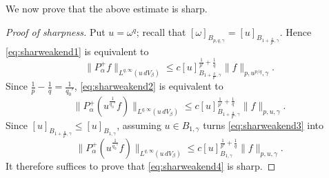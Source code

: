 \documentclass[a4paper,11pt,intlimits,oneside]{amsart}
\theoremstyle{definition}
\numberwithin{equation}{section}
\theoremstyle{definition}
\begin{document}
We now prove that the above estimate is sharp.
\begin{proof}[Proof of sharpness]
Put $u=\omega^q$; recall that $[\omega]_{B_{p,q,\gamma}}=[u]_{B_{1+\frac{q}{p'},\gamma}}$. Hence \eqref{eq:sharweakend1} is equivalent to
\begin{equation}\label{eq:sharweakend2}\|P_{\alpha}^+f\|_{L^{q,\infty}(u\,{d}V_{\beta})}\le c[u]_{B_{1+\frac{q}{p'},\gamma}}^{\frac{1}{p'}+\frac{1}{q}}\|f\|_{p,u^{p/q},\gamma}.
\end{equation}
Since $\frac{1}{p}-\frac{1}{q}=\frac{1}{q_0'}$, \eqref{eq:sharweakend2} is equivalent to
    \begin{equation}\label{eq:sharweakend3}\|P_{\alpha}^+(u^{\frac{1}{q_0'}}f)\|_{L^{q,\infty}(u\,{d}V_{\beta})}\le c[u]_{B_{1+\frac{q}{p'},\gamma}}^{\frac{1}{p'}+\frac{1}{q}}\|f\|_{p,u,\gamma}.
\end{equation}
Since $[u]_{B_{1+\frac{q}{p'},\gamma}}\le [u]_{B_{1,\gamma}}$, assuming $u\in B_{1,\gamma}$ turns \eqref{eq:sharweakend3} into
\begin{equation}\label{eq:sharweakend4}\|P_{\alpha}^+(u^{\frac{1}{q_0'}}f)\|_{L^{q,\infty}(u\,{d}V_{\beta})}\le c[u]_{B_{1,\gamma}}^{\frac{1}{p'}+\frac{1}{q}}\|f\|_{p,u,\gamma}.
\end{equation}
It therefore suffices to prove that \eqref{eq:sharweakend4} is sharp.


\end{proof}
\end{document}
